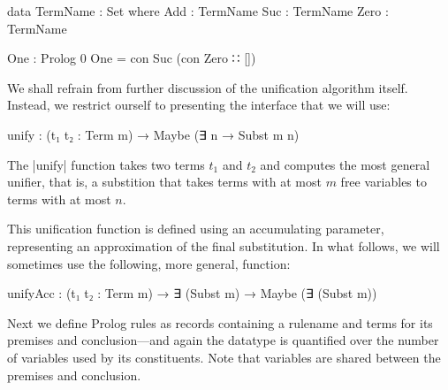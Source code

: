 \documentclass[preprint]{sigplanconf}
\begin{document}
\begin{code}
data TermName : Set where
  Add   : TermName
  Suc   : TermName
  Zero  : TermName

One : Prolog 0
One = con Suc (con Zero ∷ [])
\end{code}


We shall refrain from further discussion of the unification algorithm itself.
Instead, we restrict ourself to presenting the interface that we will use:
\begin{spec}
  unify : (t₁ t₂ : Term m) → Maybe (∃ n → Subst m n)
\end{spec}
The |unify| function takes two terms $t_1$ and $t_2$ and computes the most general
unifier, that is, a substition that takes terms with at most $m$ free
variables to terms with at most $n$.


This unification function is defined using an accumulating parameter,
representing an approximation of the final substitution. In what
follows, we will sometimes use the following, more general, function:
\begin{code}
  unifyAcc : (t₁ t₂ : Term m) →
    ∃ (Subst m) → Maybe (∃ (Subst m))
\end{code}

Next we define Prolog rules as records containing a rulename and terms for its
premises and conclusion---and again the datatype is quantified over the number of
variables used by its constituents. Note that variables are shared between the
premises and conclusion. 
\end{document}
